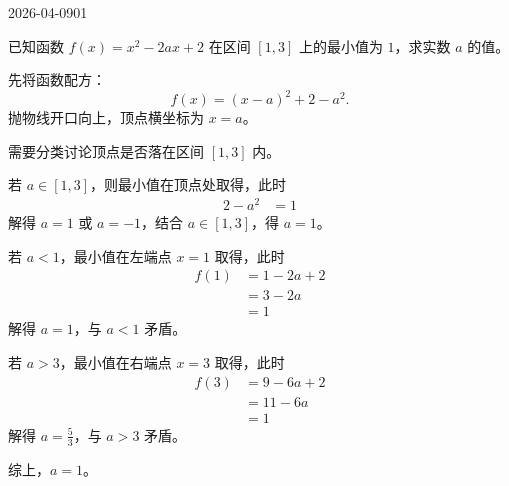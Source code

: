 \begin{mistake}{2026-04-09}{01}

\begin{problemcontent}
已知函数 $f(x)=x^2-2ax+2$ 在区间 $[1,3]$ 上的最小值为 $1$，求实数 $a$ 的值。
\end{problemcontent}

\begin{solutioncontent}
先将函数配方：
\[
  f(x)=(x-a)^2+2-a^2.
\]
抛物线开口向上，顶点横坐标为 $x=a$。

需要分类讨论顶点是否落在区间 $[1,3]$ 内。

若 $a\in[1,3]$，则最小值在顶点处取得，此时
\[
  \begin{aligned}
    2-a^2&=1
  \end{aligned}
\]
解得 $a=1$ 或 $a=-1$，结合 $a\in[1,3]$，得 $a=1$。

若 $a<1$，最小值在左端点 $x=1$ 取得，此时
\[
  \begin{aligned}
    f(1)&=1-2a+2\\
        &=3-2a\\
        &=1
  \end{aligned}
\]
解得 $a=1$，与 $a<1$ 矛盾。

若 $a>3$，最小值在右端点 $x=3$ 取得，此时
\[
  \begin{aligned}
    f(3)&=9-6a+2\\
        &=11-6a\\
        &=1
  \end{aligned}
\]
解得 $a=\frac{5}{3}$，与 $a>3$ 矛盾。

综上，$a=1$。

\end{solutioncontent}
\end{mistake}
